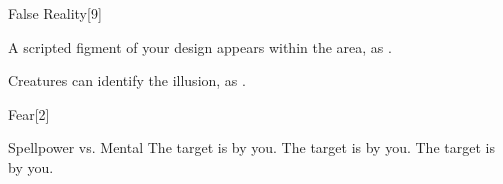 \begin{spellsection}{False Reality}[9]
    \begin{spellheader}
    \end{spellheader}
    \begin{spellcontent}
        \begin{spelltargetinginfo}
        \end{spelltargetinginfo}
        \begin{spelleffects}
            \spelleffect A scripted figment of your design appears within the area, as .
            \spelldur \durlong \dismissable
        \end{spelleffects}
    \end{spellcontent}
    \begin{spellfooter}
        \spellnotes Creatures can identify the illusion, as .
        \miscastexplode
    \end{spellfooter}
\end{spellsection}

\begin{spellsection}{Fear}[2]
    \begin{spellheader}
    \end{spellheader}
    \begin{spellcontent}
        \begin{spelltargetinginfo}
        \end{spelltargetinginfo}
        \begin{spelleffects}
            \begin{spellattack}{Spellpower vs. Mental}
                \spellsuccess The target is \frightened by you.
                \spellcritical The target is \panicked by you.
                \spellfailure The target is \shaken by you.
            \end{spellattack}
            \spelldur \durshort \dismissable
        \end{spelleffects}
    \end{spellcontent}
    \begin{spellfooter}
        \miscastrandom
    \end{spellfooter}
\end{spellsection}

